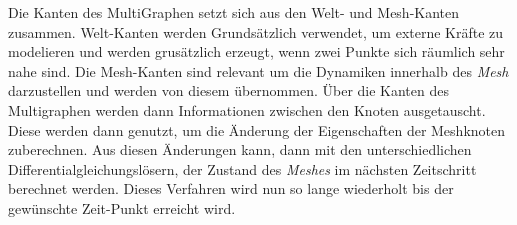 Die Kanten des MultiGraphen setzt sich aus den Welt- und Mesh-Kanten zusammen.
Welt-Kanten werden Grundsätzlich verwendet, um externe Kräfte zu modelieren und werden grusätzlich erzeugt, 
wenn zwei Punkte sich räumlich sehr nahe sind.
Die Mesh-Kanten sind relevant um die Dynamiken innerhalb des \textit{Mesh} darzustellen und werden von diesem übernommen.
Über die Kanten des Multigraphen werden dann Informationen zwischen den Knoten ausgetauscht.
Diese werden dann genutzt, um die Änderung der Eigenschaften der Meshknoten zuberechnen.
Aus diesen Änderungen kann, dann mit den unterschiedlichen Differentialgleichungslösern, der Zustand des \textit{Meshes} im nächsten Zeitschritt berechnet werden. 
Dieses Verfahren wird nun so lange wiederholt bis der gewünschte Zeit-Punkt erreicht wird.









